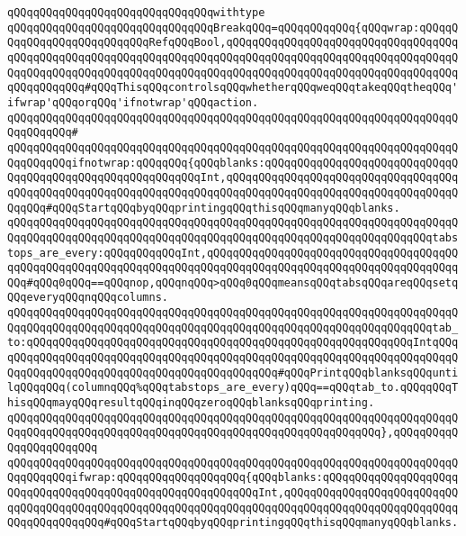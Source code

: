 \newline
\newline
\newline
\newline
\newline
\verb|qQQqqQQqqQQqqQQqqQQqqQQqqQQqqQQqwithtype|\newline
\verb|qQQqqQQqqQQqqQQqqQQqqQQqqQQqqQQqBreakqQQq=qQQqqQQqqQQq{qQQqwrap:qQQqqQQqqQQqqQQqqQQqqQQqqQQqRefqQQqBool,qQQqqQQqqQQqqQQqqQQqqQQqqQQqqQQqqQQqqQQqqQQqqQQqqQQqqQQqqQQqqQQqqQQqqQQqqQQqqQQqqQQqqQQqqQQqqQQqqQQqqQQqqQQqqQQqqQQqqQQqqQQqqQQqqQQqqQQqqQQqqQQqqQQqqQQqqQQqqQQqqQQqqQQqqQQqqQQqqQQqqQQqqQQq#qQQqThisqQQqcontrolsqQQqwhetherqQQqweqQQqtakeqQQqtheqQQq'ifwrap'qQQqorqQQq'ifnotwrap'qQQqaction.|\newline
\verb|qQQqqQQqqQQqqQQqqQQqqQQqqQQqqQQqqQQqqQQqqQQqqQQqqQQqqQQqqQQqqQQqqQQqqQQqqQQqqQQq#|\newline
\verb|qQQqqQQqqQQqqQQqqQQqqQQqqQQqqQQqqQQqqQQqqQQqqQQqqQQqqQQqqQQqqQQqqQQqqQQqqQQqqQQqifnotwrap:qQQqqQQq{qQQqblanks:qQQqqQQqqQQqqQQqqQQqqQQqqQQqqQQqqQQqqQQqqQQqqQQqqQQqqQQqqQQqInt,qQQqqQQqqQQqqQQqqQQqqQQqqQQqqQQqqQQqqQQqqQQqqQQqqQQqqQQqqQQqqQQqqQQqqQQqqQQqqQQqqQQqqQQqqQQqqQQqqQQqqQQqqQQqqQQq#qQQqStartqQQqbyqQQqprintingqQQqthisqQQqmanyqQQqblanks.|\newline
\verb|qQQqqQQqqQQqqQQqqQQqqQQqqQQqqQQqqQQqqQQqqQQqqQQqqQQqqQQqqQQqqQQqqQQqqQQqqQQqqQQqqQQqqQQqqQQqqQQqqQQqqQQqqQQqqQQqqQQqqQQqqQQqqQQqqQQqqQQqtabstops_are_every:qQQqqQQqqQQqInt,qQQqqQQqqQQqqQQqqQQqqQQqqQQqqQQqqQQqqQQqqQQqqQQqqQQqqQQqqQQqqQQqqQQqqQQqqQQqqQQqqQQqqQQqqQQqqQQqqQQqqQQqqQQqqQQq#qQQq0qQQq==qQQqnop,qQQqnqQQq>qQQq0qQQqmeansqQQqtabsqQQqareqQQqsetqQQqeveryqQQqnqQQqcolumns.|\newline
\verb|qQQqqQQqqQQqqQQqqQQqqQQqqQQqqQQqqQQqqQQqqQQqqQQqqQQqqQQqqQQqqQQqqQQqqQQqqQQqqQQqqQQqqQQqqQQqqQQqqQQqqQQqqQQqqQQqqQQqqQQqqQQqqQQqqQQqqQQqtab_to:qQQqqQQqqQQqqQQqqQQqqQQqqQQqqQQqqQQqqQQqqQQqqQQqqQQqqQQqqQQqIntqQQqqQQqqQQqqQQqqQQqqQQqqQQqqQQqqQQqqQQqqQQqqQQqqQQqqQQqqQQqqQQqqQQqqQQqqQQqqQQqqQQqqQQqqQQqqQQqqQQqqQQqqQQqqQQqqQQq#qQQqPrintqQQqblanksqQQquntilqQQqqQQq(columnqQQq%qQQqtabstops_are_every)qQQq==qQQqtab_to.qQQqqQQqThisqQQqmayqQQqresultqQQqinqQQqzeroqQQqblanksqQQqprinting.|\newline
\verb|qQQqqQQqqQQqqQQqqQQqqQQqqQQqqQQqqQQqqQQqqQQqqQQqqQQqqQQqqQQqqQQqqQQqqQQqqQQqqQQqqQQqqQQqqQQqqQQqqQQqqQQqqQQqqQQqqQQqqQQqqQQqqQQq},qQQqqQQqqQQqqQQqqQQqqQQq|\newline
\verb|qQQqqQQqqQQqqQQqqQQqqQQqqQQqqQQqqQQqqQQqqQQqqQQqqQQqqQQqqQQqqQQqqQQqqQQqqQQqqQQqifwrap:qQQqqQQqqQQqqQQqqQQq{qQQqblanks:qQQqqQQqqQQqqQQqqQQqqQQqqQQqqQQqqQQqqQQqqQQqqQQqqQQqqQQqqQQqInt,qQQqqQQqqQQqqQQqqQQqqQQqqQQqqQQqqQQqqQQqqQQqqQQqqQQqqQQqqQQqqQQqqQQqqQQqqQQqqQQqqQQqqQQqqQQqqQQqqQQqqQQqqQQqqQQq#qQQqStartqQQqbyqQQqprintingqQQqthisqQQqmanyqQQqblanks.|\newline
